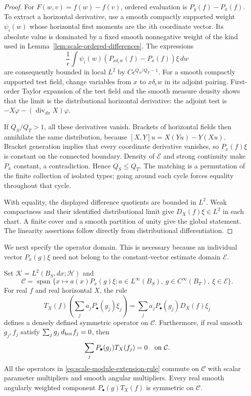 \begin{proof}
For $F(w,v)=f(w)-f(v)$, ordered evaluation is
$P_y(f)-P_x(f)$.  To extract a horizontal derivative, use a smooth
compactly supported weight $\psi_i(w)$ whose horizontal first moments
are the $i$th coordinate vector.  Its absolute value is dominated by
a fixed smooth nonnegative weight of the kind used in
Lemma~\ref{lem:scale-ordered-differences}.  The expressions
\[
 \frac1\epsilon\int\psi_i(w)
            (P_{x\delta_\epsilon w}(f)-P_x(f))\xi\,dw
\]
are consequently bounded in local $L^2$ by
$C\epsilon^{Q_S/Q_T-1}$.  For a smooth compactly supported test field,
change variables from $x$ to $x\delta_\epsilon w$ in its adjoint
pairing.  First-order Taylor expansion of the test field and the
smooth measure density shows that the limit is the distributional
horizontal derivative: the adjoint test is
$-X\varphi-(\operatorname{div}_{dx}X)\varphi$.

If $Q_S/Q_T>1$, all these derivatives vanish.  Brackets of horizontal
fields then annihilate the same distribution, because
$[X,Y]u=X(Yu)-Y(Xu)$.  Bracket generation implies that every coordinate
derivative vanishes, so $P_x(f)\xi$ is constant on the connected
boundary.  Density of $\mathscr E$ and strong continuity make $P_x$
constant, a contradiction.  Hence $Q_S\le Q_T$.  The matching is a
permutation of the finite collection of isolated types; going around
each cycle forces equality throughout that cycle.

With equality, the displayed difference quotients are bounded in
$L^2$.  Weak compactness and their identified distributional limit
give $D_X(f)\xi\in L^2$ in each chart.  A finite cover and a smooth
partition of unity give the global statement.  The linearity
assertions follow directly from distributional differentiation.
\end{proof}

We next specify the operator domain.  This is necessary because an
individual vector $P_x(g)\xi$ need not belong to the constant-vector
estimate domain $\mathscr E$.

\begin{lemma}\label{lem:scale-module-extension}
Set $\mathcal K=L^2(B_S,dx;\mathcal H)$ and
\[
 \mathcal C=\operatorname{span}\{x\mapsto a(x)P_x(g)\xi:
       a\in L^\infty(B_S),\ g\in C^\infty(B_T),\ \xi\in\mathscr E\}.
\]
For real $f$ and real horizontal $X$, the rule
\begin{equation}\label{eq:scale-module-extension-rule}
 T_X(f)\left(\sum_j a_j P_{\bullet}(g_j)\xi_j\right)
 =\sum_j a_j P_{\bullet}(g_j)D_X(f)\xi_j
\end{equation}
defines a densely defined symmetric operator on $\mathcal C$.
Furthermore, if real smooth $g_j,f_j$ satisfy
$\sum_j g_j\,d_{\rm hor}f_j=0$, then
\begin{equation}\label{eq:scale-horizontal-cancellation}
 \sum_j P_{\bullet}(g_j)T_X(f_j)=0
 \quad\hbox{on }\mathcal C.
\end{equation}
All the operators in \eqref{eq:scale-module-extension-rule} commute on
$\mathcal C$ with scalar parameter multipliers and smooth angular
multipliers.  Every real smooth angularly weighted component
$P_{\bullet}(g)T_X(f)$ is symmetric on $\mathcal C$.
\end{lemma}

